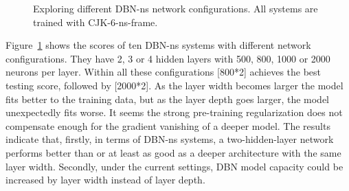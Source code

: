 \begin{figure}[htb]
	\centering
	\caption{Exploring different DBN-ns network configurations. All systems are trained with CJK-6-ns-frame.}
	\label{fig:3-dbn-ns-configs}
\end{figure}

Figure~\ref{fig:3-dbn-ns-configs} shows the scores of ten DBN-ns systems with different network configurations. They have 2, 3 or 4 hidden layers with 500, 800, 1000 or 2000 neurons per layer. Within all these configurations [800*2] achieves the best testing score, followed by [2000*2]. As the layer width becomes larger the model fits better to the training data, but as the layer depth goes larger, the model unexpectedly fits worse. It seems the strong pre-training regularization does not compensate enough for the gradient vanishing of a deeper model. The results indicate that, firstly, in terms of DBN-ns systems, a two-hidden-layer network performs better than or at least as good as a deeper architecture with the same layer width. Secondly, under the current settings, DBN model capacity could be increased by layer width instead of layer depth.

